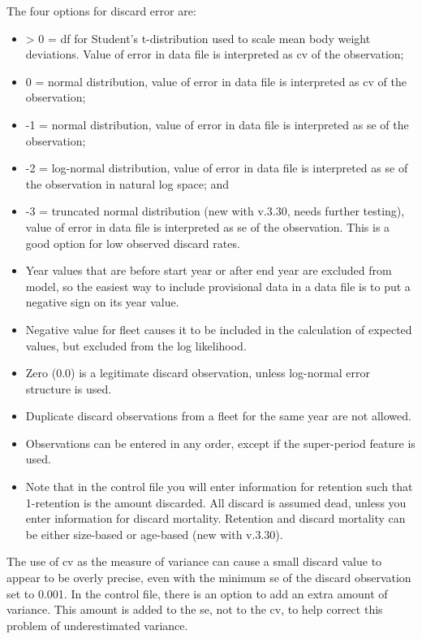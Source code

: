 The four options for discard error are:
\begin{itemize}
	\item > 0 = \gls{df} for Student's t-distribution used to scale mean body weight deviations. Value of error in data file is interpreted as \gls{cv} of the observation;
	\item 0 = normal distribution, value of error in data file is interpreted as \gls{cv} of the observation;
	\item -1 = normal distribution, value of error in data file is interpreted as \gls{se} of the observation;
	\item -2 = log-normal distribution, value of error in data file is interpreted as \gls{se} of the observation in natural log space; and 
	\item -3 = truncated normal distribution (new with v.3.30, needs further testing), value of error in data file is interpreted as \gls{se} of the observation. This is a good option for low observed discard rates.
\end{itemize}

\begin{itemize}
	\item Year values that are before start year or after end year are excluded from model, so the easiest way to include provisional data in a data file is to put a negative sign on its year value.
	\item Negative value for fleet causes it to be included in the calculation of expected values, but excluded from the log likelihood.
	\item Zero (0.0) is a legitimate discard observation, unless log-normal error structure is used.
	\item Duplicate discard observations from a fleet for the same year are not allowed.
	\item Observations can be entered in any order, except if the super-period feature is used. 
	\item Note that in the control file you will enter information for retention such that 1-retention is the amount discarded. All discard is assumed dead, unless you enter information for discard mortality. Retention and discard mortality can be either size-based or age-based (new with v.3.30).
\end{itemize}
	
The use of \gls{cv} as the measure of variance can cause a small discard value to appear to be overly precise, even with the minimum \gls{se} of the discard observation set to 0.001. In the control file, there is an option to add an extra amount of variance. This amount is added to the \gls{se}, not to the \gls{cv}, to help correct this problem of underestimated variance.

